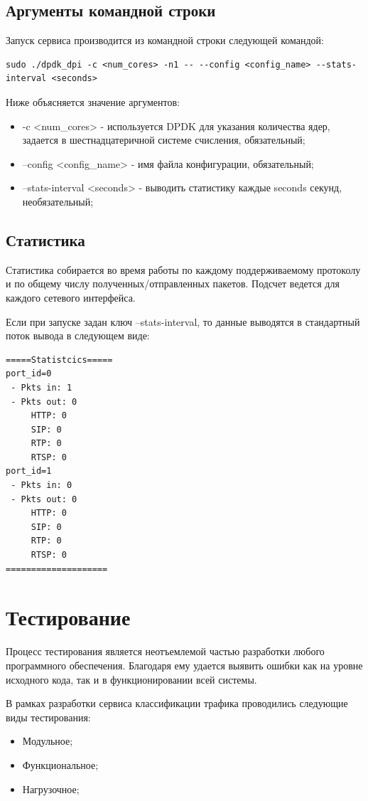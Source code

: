 \subsection{Аргументы командной строки}
Запуск сервиса производится из командной строки следующей командой:
\begin{lstlisting}
sudo ./dpdk_dpi -c <num_cores> -n1 -- --config <config_name> --stats-interval <seconds>
\end{lstlisting}
Ниже объясняется значение аргументов:
\begin{itemize}
\item -c <num\_cores> - используется DPDK для указания количества ядер, задается в шестнадцатеричной системе счисления, обязательный;
\item --config <config\_name> - имя файла конфигурации, обязательный;
\item --stats-interval <seconds> - выводить статистику каждые seconds секунд, необязательный;
\end{itemize}

\subsection{Статистика}
Статистика собирается во время работы по каждому поддерживаемому протоколу и по общему числу полученных/отправленных пакетов. Подсчет ведется для каждого сетевого интерфейса.

Если при запуске задан ключ --stats-interval, то данные выводятся в стандартный поток вывода в следующем виде:
\begin{lstlisting}
=====Statistcics=====
port_id=0
 - Pkts in: 1
 - Pkts out: 0
     HTTP: 0
     SIP: 0
     RTP: 0
     RTSP: 0
port_id=1
 - Pkts in: 0
 - Pkts out: 0
     HTTP: 0
     SIP: 0
     RTP: 0
     RTSP: 0
====================
\end{lstlisting}


\section{Тестирование}
Процесс тестирования является неотъемлемой частью разработки любого программного обеспечения. Благодаря ему удается выявить ошибки как на уровне исходного кода, так и в функционировании всей системы.

В рамках разработки сервиса классификации трафика проводились следующие виды тестирования:
\begin{itemize}
\item Модульное;
\item Функциональное;
\item Нагрузочное;
\end{itemize}


